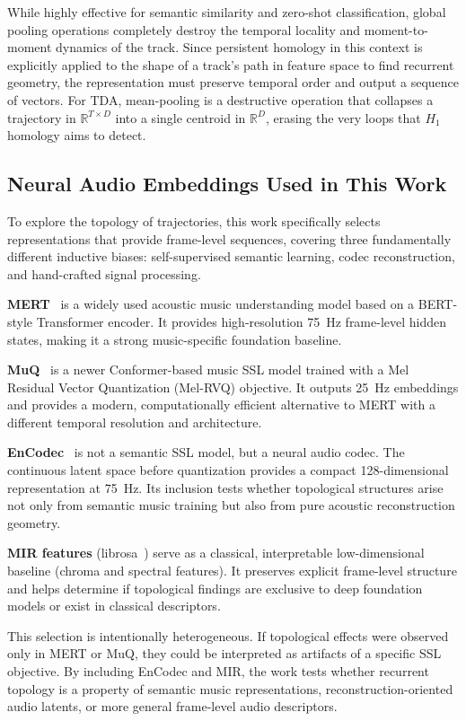 While highly effective for semantic similarity and zero-shot classification, global pooling operations completely destroy the temporal locality and moment-to-moment dynamics of the track. Since persistent homology in this context is explicitly applied to the shape of a track's path in feature space to find recurrent geometry, the representation must preserve temporal order and output a sequence of vectors. For TDA, mean-pooling is a destructive operation that collapses a trajectory in $\mathbb{R}^{T \times D}$ into a single centroid in $\mathbb{R}^D$, erasing the very loops that $H_1$ homology aims to detect. 

\subsection{Neural Audio Embeddings Used in This Work}

To explore the topology of trajectories, this work specifically selects representations that provide frame-level sequences, covering three fundamentally different inductive biases: self-supervised semantic learning, codec reconstruction, and hand-crafted signal processing.

\textbf{MERT}~\cite{li2023mert} is a widely used acoustic music understanding model based on a BERT-style Transformer encoder. It provides high-resolution 75~Hz frame-level hidden states, making it a strong music-specific foundation baseline.

\textbf{MuQ}~\cite{zhu2025muq} is a newer Conformer-based music SSL model trained with a Mel Residual Vector Quantization (Mel-RVQ) objective. It outputs 25~Hz embeddings and provides a modern, computationally efficient alternative to MERT with a different temporal resolution and architecture.

\textbf{EnCodec}~\cite{defossez2022encodec} is not a semantic SSL model, but a neural audio codec. The continuous latent space before quantization provides a compact 128-dimensional representation at 75~Hz. Its inclusion tests whether topological structures arise not only from semantic music training but also from pure acoustic reconstruction geometry.

\textbf{MIR features} (librosa~\cite{mcfee2015librosa}) serve as a classical, interpretable low-dimensional baseline (chroma and spectral features). It preserves explicit frame-level structure and helps determine if topological findings are exclusive to deep foundation models or exist in classical descriptors.

This selection is intentionally heterogeneous. If topological effects were observed only in MERT or MuQ, they could be interpreted as artifacts of a specific SSL objective. By including EnCodec and MIR, the work tests whether recurrent topology is a property of semantic music representations, reconstruction-oriented audio latents, or more general frame-level audio descriptors.

